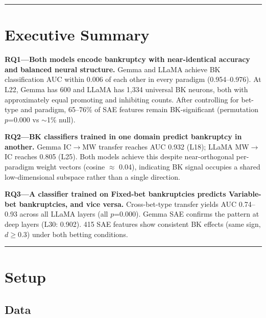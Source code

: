 \documentclass[11pt,a4paper]{article}
\begin{document}
\bigskip\hrule\bigskip

\section*{Executive Summary}

\textbf{RQ1---Both models encode bankruptcy with near-identical accuracy and balanced neural structure.} Gemma and LLaMA achieve BK classification AUC within 0.006 of each other in every paradigm (0.954--0.976). At L22, Gemma has 600 and LLaMA has 1{,}334 universal BK neurons, both with approximately equal promoting and inhibiting counts. After controlling for bet-type and paradigm, 65--76\% of SAE features remain BK-significant (permutation $p$=0.000 vs ${\sim}$1\% null).

\textbf{RQ2---BK classifiers trained in one domain predict bankruptcy in another.} Gemma IC$\rightarrow$MW transfer reaches AUC 0.932 (L18); LLaMA MW$\rightarrow$IC reaches 0.805 (L25). Both models achieve this despite near-orthogonal per-paradigm weight vectors (cosine $\approx$ 0.04), indicating BK signal occupies a shared low-dimensional subspace rather than a single direction.

\textbf{RQ3---A classifier trained on Fixed-bet bankruptcies predicts Variable-bet bankruptcies, and vice versa.} Cross-bet-type transfer yields AUC 0.74--0.93 across all LLaMA layers (all $p$=0.000). Gemma SAE confirms the pattern at deep layers (L30: 0.902). 415 SAE features show consistent BK effects (same sign, $d$$\geq$0.3) under both betting conditions.

\bigskip\hrule\bigskip

\section{Setup}

\subsection{Data}
\end{document}

